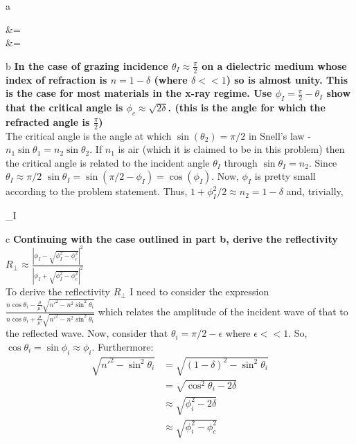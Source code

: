 \begin{homeworkProblem}
\begin{homeworkSection}{a}
  \begin{problemAnswer}{
 &=  \\
   &= }
\end{problemAnswer}

\end{homeworkSection}
\begin{homeworkSection}{b}
\textbf{In the case of grazing incidence $\theta_I \approx \frac{\pi}{2}$ on a dielectric medium whose index of refraction is $n = 1-\delta$ (where $\delta << 1$) so is almost unity. This is the case for most materials in the x-ray regime. Use $\phi_I = \frac{\pi}{2} - \theta_I$ show that the critical angle is $\phi_c \approx \sqrt{2\delta}$. (this is the angle for which the refracted angle is $\frac{\pi}{2}$)}
\\

The critical angle is the angle at which $\sin(\theta_2)= \pi/2$ in Snell's law - $n_1 \sin\theta_1 = n_2\sin\theta_2$. If $n_1$ is air (which it is claimed to be in this problem) then the critical angle is related to the incident angle $\theta_I$ through $\sin\theta_I = n_2$. Since $\theta_I \approx \pi/2$ $\sin\theta_I = \sin(\pi/2-\phi_I) = \cos(\phi_I)$. Now, $\phi_I$ is pretty small according to the problem statement. Thus, $1+\phi_I^2/2 \approx n_2 = 1-\delta$ and, trivially, 
\begin{problemAnswer}{
  \sqrt{2\delta}\approx \phi_I}
\end{problemAnswer}
\end{homeworkSection}

\begin{homeworkSection}{c}
\textbf{Continuing with the case outlined in part b, derive the reflectivity $R_\bot \approx \frac{|\phi_I-\sqrt{\phi_I^2-\phi_c^2}|^2}{|\phi_I+\sqrt{\phi_I^2-\phi_c^2}|^2}$}
\\

To derive the reflectivity $R_\bot$ I need to consider the expression $\frac{n\cos\theta_i - \frac{\mu}{\mu'}\sqrt{n'^2-n^2\sin^2\theta_i}}{n\cos\theta_i+\frac{\mu}{\mu'}\sqrt{n'^2-n^2\sin^2\theta_i}}$ which relates the amplitude of the incident wave of that to the reflected wave. Now, consider that $\theta_i = \pi/2 - \epsilon$ where $\epsilon << 1 $. So, $\cos\theta_i = \sin\phi_i \approx \phi_i$. Furthermore:
\begin{align*}
\sqrt{n'^2-\sin^2\theta_i} &= \sqrt{(1-\delta)^2-\sin^2\theta_i} \\
& = \sqrt{\cos^2\theta_i - 2\delta} \\
& \approx \sqrt{\phi_i^2-2\delta} \\
& \approx \sqrt{\phi_i^2-\phi^2_c}
\end{align*}


\end{homeworkSection}
\end{homeworkProblem}

